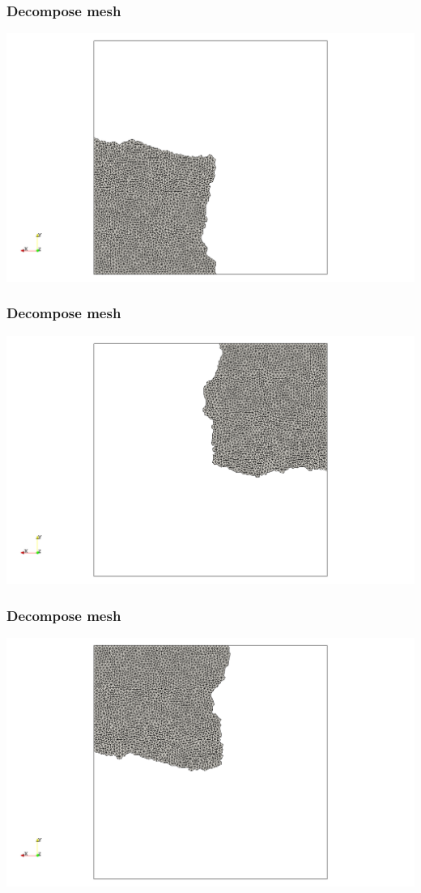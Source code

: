 \documentclass[12pt]{beamer}
\begin{document}
\begin{frame}
    \frametitle{Decompose mesh}
\vspace{-2mm}
\includegraphics[width=\textwidth]{images/partition2.png}
\end{frame}
\begin{frame}
    \frametitle{Decompose mesh}
\vspace{-2mm}
\includegraphics[width=\textwidth]{images/partition3.png}
\end{frame}
\begin{frame}
    \frametitle{Decompose mesh}
\vspace{-2mm}
\includegraphics[width=\textwidth]{images/partition4.png}
\end{frame}
\end{document}
